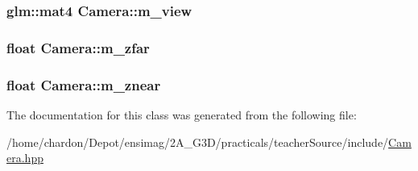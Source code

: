 \hypertarget{classCamera_ad0e8cb00cfe1dd9a2aabd7ed92bde2e4}{
\subsubsection[{m\+\_\+view}]{\setlength{\rightskip}{0pt plus 5cm}glm\+::mat4 Camera\+::m\+\_\+view\hspace{0.3cm}{\ttfamily [private]}}}\label{classCamera_ad0e8cb00cfe1dd9a2aabd7ed92bde2e4}
\hypertarget{classCamera_a2a5760d0aff07b0dd1039ee7ccc2596c}{
\subsubsection[{m\+\_\+zfar}]{\setlength{\rightskip}{0pt plus 5cm}float Camera\+::m\+\_\+zfar\hspace{0.3cm}{\ttfamily [private]}}}\label{classCamera_a2a5760d0aff07b0dd1039ee7ccc2596c}
\hypertarget{classCamera_a3e01bcfeedeb9ee1950bca467dcd2185}{
\subsubsection[{m\+\_\+znear}]{\setlength{\rightskip}{0pt plus 5cm}float Camera\+::m\+\_\+znear\hspace{0.3cm}{\ttfamily [private]}}}\label{classCamera_a3e01bcfeedeb9ee1950bca467dcd2185}


The documentation for this class was generated from the following file\+:\begin{DoxyCompactItemize}
\item 
/home/chardon/\+Depot/ensimag/2\+A\+\_\+\+G3\+D/practicals/teacher\+Source/include/\hyperlink{Camera_8hpp}{Camera.\+hpp}\end{DoxyCompactItemize}
